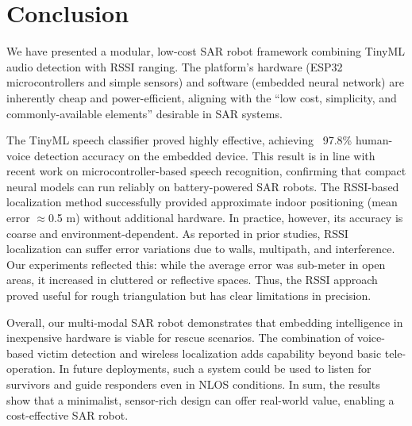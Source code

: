 \section{Conclusion}
We have presented a modular, low-cost SAR robot framework combining TinyML audio detection with RSSI ranging. The platform’s hardware (ESP32 microcontrollers and simple sensors) and software (embedded neural network) are inherently cheap and power-efficient, aligning with the “low cost, simplicity, and commonly-available elements” desirable in SAR systems. 

The TinyML speech classifier proved highly effective, achieving ~97.8\% human-voice detection accuracy on the embedded device. This result is in line with recent work on microcontroller-based speech recognition, confirming that compact neural models can run reliably on battery-powered SAR robots. The RSSI-based localization method successfully provided approximate indoor positioning (mean error $\approx$0.5 m) without additional hardware. In practice, however, its accuracy is coarse and environment-dependent. As reported in prior studies, RSSI localization can suffer error variations due to walls, multipath, and interference. Our experiments reflected this: while the average error was sub-meter in open areas, it increased in cluttered or reflective spaces. Thus, the RSSI approach proved useful for rough triangulation but has clear limitations in precision.

Overall, our multi-modal SAR robot demonstrates that embedding intelligence in inexpensive hardware is viable for rescue scenarios. The combination of voice-based victim detection and wireless localization adds capability beyond basic tele-operation. In future deployments, such a system could be used to listen for survivors and guide responders even in NLOS conditions. In sum, the results show that a minimalist, sensor-rich design can offer real-world value, enabling a cost-effective SAR robot.